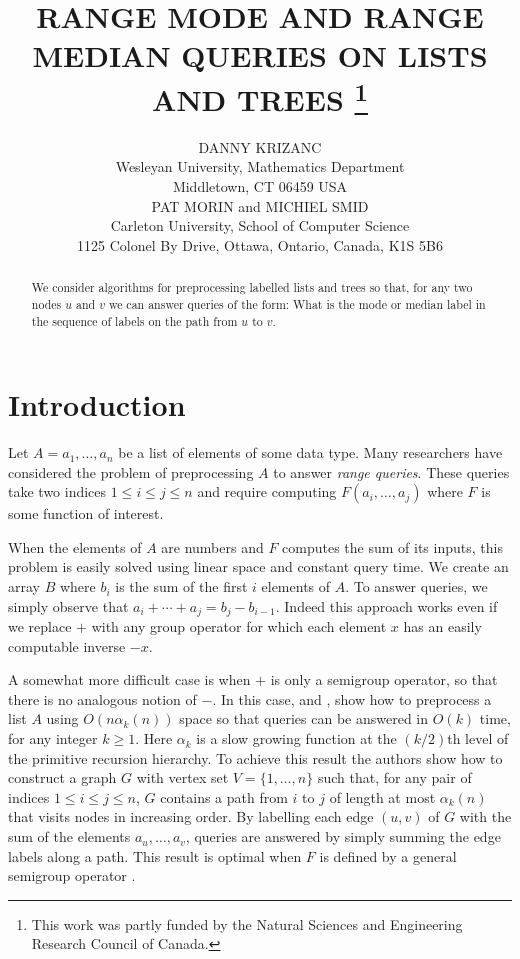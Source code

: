 \documentclass{njcarticle}
\title{\MakeUppercase{Range Mode and Range Median Queries on Lists and
		Trees}%
	\thanks{This work was partly funded by the Natural Sciences
	and Engineering Research Council of Canada.}}
\author{\MakeUppercase{Danny Krizanc} \\ 
	Wesleyan University, Mathematics Department \\
	Middletown, CT 06459 USA \\
	\email{dkrizanc@wesleyan.edu} \AND
	\MakeUppercase{Pat Morin} and \MakeUppercase{Michiel Smid} \\
	Carleton University, School of Computer Science \\
	1125 Colonel By Drive, Ottawa, Ontario, Canada, K1S 5B6 \\
	\email{\{morin,smid\}@cs.carleton.ca}}
\date{}
\begin{document}
\maketitle

\begin{abstract}
We consider algorithms for preprocessing labelled lists and trees so
that, for any two nodes $u$ and $v$ we can answer queries of the form:
What is the mode or median label in the sequence of labels on the path from
$u$ to $v$.
\end{abstract}

\section{Introduction}

Let $A=a_1,\ldots,a_n$ be a list of elements of some data type.  Many
researchers have considered the problem of preprocessing $A$ to answer
\emph{range queries}.  These queries take two indices $1\le i\le j\le
n$ and require computing $F(a_i,\ldots,a_j)$ where $F$ is some
function of interest.

When the elements of $A$ are numbers and $F$ computes the sum of its
inputs, this problem is easily solved using linear space and constant
query time.  We create an array $B$ where $b_i$ is the sum of the
first $i$ elements of $A$.  To answer queries, we simply observe that
$a_i+\cdots+a_j=b_j-b_{i-1}$.  Indeed this approach works even if we
replace $+$ with any group operator for which each element $x$ has an
easily computable inverse $-x$.

A somewhat more difficult case is when $+$ is only a semigroup
operator, so that there is no analogous notion of $-$.  In this case,
\cite{y82} and \cite{as87}, show how to
preprocess a list $A$ using $O(n\alpha_k(n))$ space so that queries
can be answered in $O(k)$ time, for any integer $k\ge 1$.  Here
$\alpha_k$ is a slow growing function at the $(k/2)$th level of the
primitive recursion hierarchy.  To achieve this result the authors
show how to construct a graph $G$ with vertex set $V=\{1,\ldots,n\}$
such that, for any pair of indices $1\le i\le j\le n$, $G$ contains a
path from $i$ to $j$ of length at most $\alpha_k(n)$ that visits nodes
in increasing order.  By labelling each edge $(u,v)$ of $G$ with the
sum of the elements $a_u,\ldots,a_v$, queries are answered by simply
summing the edge labels along a path.  This result is optimal when $F$
is defined by a general semigroup operator .
\end{document}
